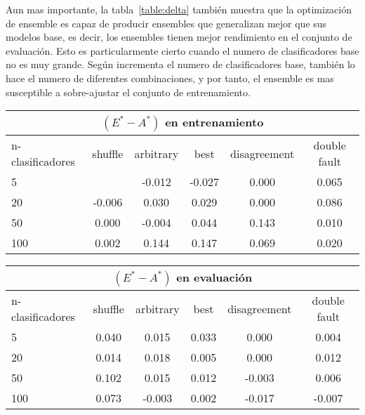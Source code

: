 Aun mas importante, la tabla~\ref{table:delta} también muestra que la optimización de ensemble es capaz de producir ensembles que generalizan mejor que sus modelos base, es decir, los ensembles tienen mejor rendimiento en el conjunto de evaluación.
Esto es particularmente cierto cuando el numero de clasificadores base no es muy grande. Según incrementa el numero de clasificadores base, también lo hace el numero de diferentes combinaciones, y por tanto, el ensemble es mas susceptible a sobre-ajustar el conjunto de entrenamiento.

\begin{table}[!htb]
    \centering

    \begin{tabular}{lccccc}
    \toprule
        \multicolumn{6}{c}{$(E^* - A^*)$ en entrenamiento} \\ \midrule
        n-clasificadores & shuffle & arbitrary & best & disagreement & double fault  \\ \midrule \midrule
        5  & \cellcolor{red!25}{-0.076}   & \cellcolor{red!25}-0.012   & \cellcolor{red!25}-0.027   & \cellcolor{yellow!25}0.000   & \cellcolor{green!25}0.065 \\
        20 & \cellcolor{red!25}-0.006  & \cellcolor{green!25}0.030  & \cellcolor{green!25}0.029  & \cellcolor{yellow!25}0.000  & \cellcolor{green!25}0.086 \\
        50 & \cellcolor{yellow!25}0.000  & \cellcolor{red!25}-0.004  & \cellcolor{green!25}0.044  & \cellcolor{green!25}0.143  & \cellcolor{green!25}0.010 \\
        100 & \cellcolor{green!25}0.002  & \cellcolor{green!25}0.144  & \cellcolor{green!25}0.147  & \cellcolor{green!25}0.069  & \cellcolor{green!25}0.020 \\
    \bottomrule
    \end{tabular}

    \begin{tabular}{lccccc}
    \toprule
        \multicolumn{6}{c}{$(E^* - A^*)$ en evaluación} \\ \midrule
        n-clasificadores & shuffle & arbitrary & best & disagreement & double fault  \\ \midrule \midrule
        5  & \cellcolor{green!25}0.040   & \cellcolor{green!25}0.015   & \cellcolor{green!25}0.033   & \cellcolor{yellow!25}0.000   & \cellcolor{green!25}0.004 \\
        20 & \cellcolor{green!25}0.014  & \cellcolor{green!25}0.018  & \cellcolor{green!25}0.005  & \cellcolor{yellow!25}0.000  & \cellcolor{green!25}0.012 \\
        50 & \cellcolor{green!25}0.102  & \cellcolor{green!25}0.015  & \cellcolor{green!25}0.012  & \cellcolor{red!25}-0.003  & \cellcolor{green!25}0.006 \\
        100 & \cellcolor{green!25}0.073  & \cellcolor{red!25}-0.003  & \cellcolor{green!25}0.002  & \cellcolor{red!25}-0.017  & \cellcolor{red!25}-0.007 \\
    \bottomrule
    \end{tabular}


\end{table}

